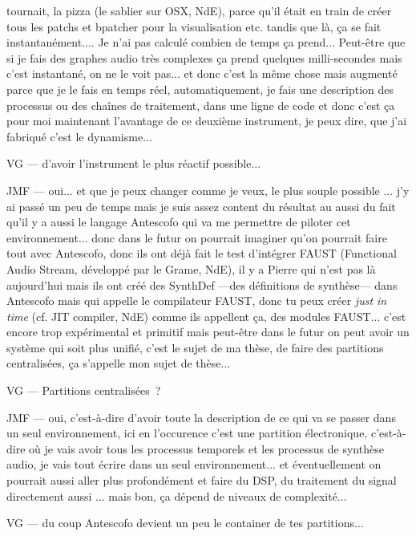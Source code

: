 tournait, la pizza (le sablier sur OSX, NdE), parce qu'il était en train de créer tous les patchs et bpatcher pour la visualisation etc. tandis que là, ça se fait instantanément.... Je n'ai pas calculé combien de temps ça prend... Peut-être que si je fais des graphes audio très complexes ça prend quelques milli-secondes mais c'est instantané, on ne le voit pas... et donc c'est la même chose mais augmenté parce que je le fais en temps réel, automatiquement, je fais une description des processus ou des chaînes de traitement, dans une ligne de code et donc c'est ça pour moi maintenant l'avantage de ce deuxième instrument, je peux dire, que j'ai fabriqué c'est le dynamisme...  

VG — d'avoir l'instrument le plus réactif possible... 

JMF — oui... et que je peux changer comme je veux, le plus souple possible ... j'y ai passé un peu de temps mais je suis assez content du résultat au aussi du fait qu'il y a aussi le langage Antescofo qui va me permettre de piloter cet environnement... donc dans le futur on pourrait imaginer qu'on pourrait faire tout avec Antescofo, donc ils ont déjà fait le test d'intégrer FAUST (Functional Audio Stream, développé par le Grame, NdE), il y a Pierre qui n'est pas là aujourd'hui mais ils ont créé des SynthDef —des définitions de synthèse— dans Antescofo mais qui appelle le compilateur FAUST, donc tu peux créer \textit{just in time} (cf. JIT compiler, NdE) comme ils appellent ça, des modules FAUST... c'est encore trop expérimental et primitif mais peut-être dans le futur on peut avoir un système qui soit plus unifié, c'est le sujet de ma thèse, de faire des partitions centralisées, ça s'appelle mon sujet de thèse...  

VG — Partitions centralisées ? 

JMF — oui, c'est-à-dire d'avoir toute la description de ce qui va se passer dans un seul environnement, ici en l'occurence c'est une partition électronique, c'est-à-dire où je vais avoir tous les processus temporels et les processus de synthèse audio, je vais tout écrire dans un seul environnement... et éventuellement on pourrait aussi aller plus profondément et faire du DSP, du traitement du signal directement aussi ... mais bon, ça dépend de niveaux de complexité... 

VG — du coup Antescofo devient un peu le container de tes partitions... 

